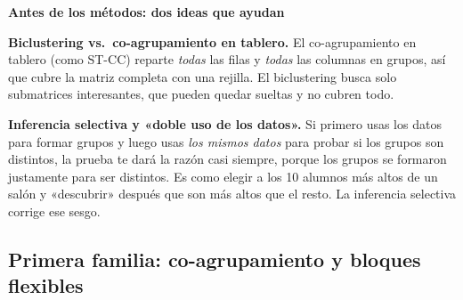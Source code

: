 \documentclass[11pt,a4paper]{article}
\newcommand{\cajainicio}[3]{\par\medskip\noindent
  \begin{lrbox}{\cajabox}\begin{minipage}{\dimexpr\linewidth-2\fboxsep-2\fboxrule\relax}%
  \textbf{\color{#1}#3}\par\smallskip}
\newcommand{\cajafin}[2]{\end{minipage}\end{lrbox}\fcolorbox{#1}{#2}{\usebox{\cajabox}}\par\medskip}
\newenvironment{nota}[1]{\cajainicio{acc}{acc!7}{#1}}{\cajafin{acc}{acc!7}}
\newcommand{\STCC}{ST-CC}
\begin{document}
\begin{nota}{Antes de los métodos: dos ideas que ayudan}
\textbf{Biclustering vs.\ co-agrupamiento en tablero.} El co-agrupamiento en tablero (como \STCC) reparte \emph{todas} las filas y \emph{todas} las columnas en grupos, así que cubre la matriz completa con una rejilla. El biclustering busca solo submatrices interesantes, que pueden quedar sueltas y no cubren todo.

\textbf{Inferencia selectiva y «doble uso de los datos».} Si primero usas los datos para formar grupos y luego usas \emph{los mismos datos} para probar si los grupos son distintos, la prueba te dará la razón casi siempre, porque los grupos se formaron justamente para ser distintos. Es como elegir a los 10 alumnos más altos de un salón y «descubrir» después que son más altos que el resto. La inferencia selectiva corrige ese sesgo.
\end{nota}

\subsection*{Primera familia: co-agrupamiento y bloques flexibles}
\end{document}
